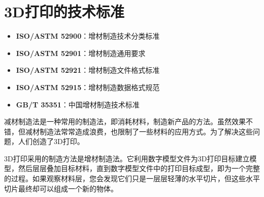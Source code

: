 \documentclass[12pt,UTF8]{ctexbook}
\begin{document}
\section{3D打印的技术标准}
\begin{itemize}
\item \textbf{ISO/ASTM 52900}：增材制造技术分类标准
\item \textbf{ISO/ASTM 52901}：增材制造通用要求
\item \textbf{ISO/ASTM 52921}：增材制造文件格式标准
\item \textbf{ISO/ASTM 52915}：增材制造数据格式规范
\item \textbf{GB/T 35351}：中国增材制造技术标准
\end{itemize}

减材制造法是一种常用的制造法，即消耗材料，制造新产品的方法。虽然效果不错，但减材制造法常常造成浪费，也限制了一些材料的应用方式。为了解决这些问题，人们创造了3D打印。

3D打印采用的制造方法是增材制造法。它利用数字模型文件为3D打印目标建立模型，然后层层叠加目标材料，直到数字模型文件中的打印目标成型，即为一个完整的过程。如果观察材料层，您会发现它们只是一层层轻薄的水平切片，但这些水平切片最终却可以组成一个新的物体。
\end{document}
